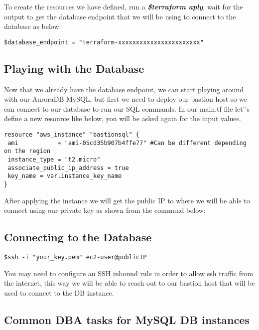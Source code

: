 \documentclass{article}
\begin{document}
To create the resources we have defined, run a \textbf{\emph{\$terraform aply}}, wait for the output to get the database endpoint that we will be using to connect to the database as below:

\begin{lstlisting}[caption=Database Endpoint output]
$database_endpoint = "terraform-xxxxxxxxxxxxxxxxxxxxxxx"
\end{lstlisting}

\subsection{Playing with the Database}

Now that we already have the database endpoint, we can start playing around with our AuroraDB MySQL, but first we need to deploy our bastion host so we can connect to our database to run our SQL commands. In our main.tf file let'’s define a new resource like below, you will be asked again for the input values.

\begin{lstlisting}[caption=Database Endpoint output]
resource "aws_instance" "bastionsql" {
 ami           = "ami-05cd35b907b4ffe77" #Can be different depending on the region
 instance_type = "t2.micro"
 associate_public_ip_address = true
 key_name = var.instance_key_name
}

\end{lstlisting}

After applying the instance we will get the public IP to where we will be able to connect using our private key as shown from the command below:

\subsection{Connecting to the Database}

\begin{lstlisting}[caption=Database Endpoint output]
$ssh -i "your_key.pem" ec2-user@publicIP
\end{lstlisting}
You may need to configure an SSH inbound rule in order to allow ssh traffic from the internet, this way we will be able to reach out to our bastion host that will be used to connect to the DB instance. 

\subsection{Common DBA tasks for MySQL DB instances}
\end{document}
